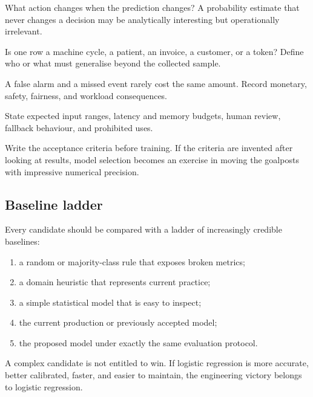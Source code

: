 \begin{tcbitemize}[skin=sectionraster]
    \tcbitem[title=Decision and action, raster multicolumn=3]
    What action changes when the prediction changes?
    A probability estimate that never changes a decision may be analytically
    interesting but operationally irrelevant.

    \tcbitem[title=Unit and population, raster multicolumn=3]
    Is one row a machine cycle, a patient, an invoice, a customer, or a token?
    Define who or what must generalise beyond the collected sample.

    \tcbitem[title=Error costs, raster multicolumn=3]
    A false alarm and a missed event rarely cost the same amount.
    Record monetary, safety, fairness, and workload consequences.

    \tcbitem[title=Operating conditions, raster multicolumn=3]
    State expected input ranges, latency and memory budgets, human review,
    fallback behaviour, and prohibited uses.
\end{tcbitemize}

\begin{engineernote}
Write the acceptance criteria before training.
If the criteria are invented after looking at results, model selection becomes
an exercise in moving the goalposts with impressive numerical precision.
\end{engineernote}

\subsection{Baseline ladder}

Every candidate should be compared with a ladder of increasingly credible
baselines:

\begin{enumerate}
    \item a random or majority-class rule that exposes broken metrics;
    \item a domain heuristic that represents current practice;
    \item a simple statistical model that is easy to inspect;
    \item the current production or previously accepted model;
    \item the proposed model under exactly the same evaluation protocol.
\end{enumerate}

A complex candidate is not entitled to win.
If logistic regression is more accurate, better calibrated, faster, and easier
to maintain, the engineering victory belongs to logistic regression.

